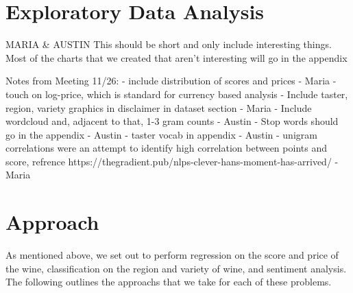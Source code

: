 \documentclass[11pt,english]{article}
\begin{document}
\section{Exploratory Data Analysis}
    MARIA \& AUSTIN
    This should be short and only include interesting things. Most of the charts that we created that aren't interesting will go in the appendix

    Notes from Meeting 11/26:
    - include distribution of scores and prices - Maria
        - touch on log-price, which is standard for currency based analysis
    - Include taster, region, variety graphics in disclaimer in dataset section - Maria
    - Include wordcloud and, adjacent to that, 1-3 gram counts - Austin
    - Stop words should go in the appendix - Austin
    - taster vocab in appendix - Austin
    - unigram correlations were an attempt to identify high correlation between points and score, refrence https://thegradient.pub/nlps-clever-hans-moment-has-arrived/ - Maria

\section{Approach}
    As mentioned above, we set out to perform regression on the score and price of the wine, classification on the region and variety of wine, and sentiment analysis. The following outlines the approachs that we take for each of these problems.
\end{document}
